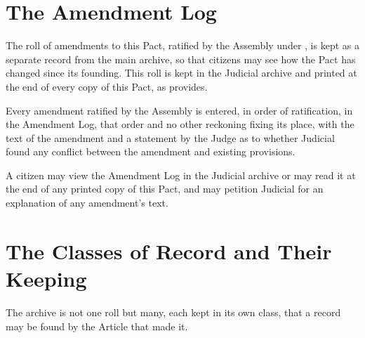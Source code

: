 \section{The Amendment Log}
\label{sec:records:amendment-log}

The roll of amendments to this Pact, ratified by the Assembly under , is kept as a separate record from the main archive, so that citizens may see how the Pact has changed since its founding. This roll is kept in the Judicial archive and printed at the end of every copy of this Pact, as  provides.

\begin{clauses}
\item Every amendment ratified by the Assembly is entered, in order of ratification, in the Amendment Log, that order and no other reckoning fixing its place, with the text of the amendment and a statement by the Judge as to whether Judicial found any conflict between the amendment and existing provisions.
\item A citizen may view the Amendment Log in the Judicial archive or may read it at the end of any printed copy of this Pact, and may petition Judicial for an explanation of any amendment's text.
\end{clauses}

\section{The Classes of Record and Their Keeping}
\label{sec:records:classes-of-record-and-their-keeping}

The archive is not one roll but many, each kept in its own class, that a record may be found by the Article that made it.

